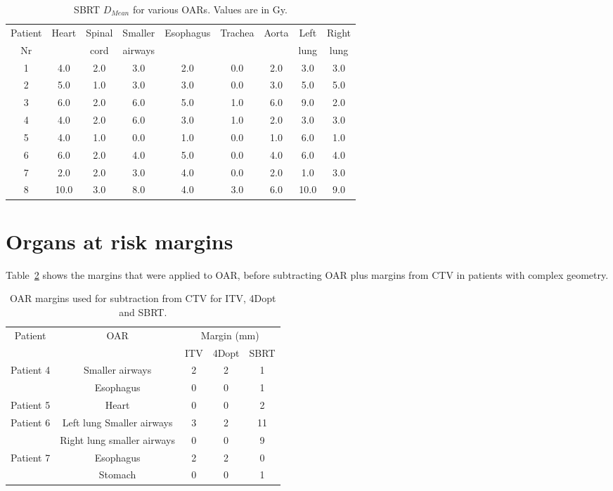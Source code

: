 \begin{table}[H]
  \centering
  \caption{SBRT $D_{Mean}$ for various OARs. Values are in Gy.}
  \begin{tabular}{c|c|c|c|c|c|c|c|c}
   Patient & \multirow{2}{*}{Heart} & Spinal  & Smaller  & \multirow{2}{*}{Esophagus} & \multirow{2}{*}{Trachea} & \multirow{2}{*}{Aorta} & Left  & Right \\
   Nr & & cord & airways & & & & lung & lung \\
 \hline\hline 
1 & 4.0 & 2.0 & 3.0 & 2.0 & 0.0 & 2.0 & 3.0 & 3.0 \\ 
2 & 5.0 & 1.0 & 3.0 & 3.0 & 0.0 & 3.0 & 5.0 & 5.0 \\ 
3 & 6.0 & 2.0 & 6.0 & 5.0 & 1.0 & 6.0 & 9.0 & 2.0 \\ 
4 & 4.0 & 2.0 & 6.0 & 3.0 & 1.0 & 2.0 & 3.0 & 3.0 \\ 
5 & 4.0 & 1.0 & 0.0 & 1.0 & 0.0 & 1.0 & 6.0 & 1.0 \\ 
6 & 6.0 & 2.0 & 4.0 & 5.0 & 0.0 & 4.0 & 6.0 & 4.0 \\ 
7 & 2.0 & 2.0 & 3.0 & 4.0 & 0.0 & 2.0 & 1.0 & 3.0 \\ 
8 & 10.0 & 3.0 & 8.0 & 4.0 & 3.0 & 6.0 & 10.0 & 9.0 \\ 
\hline\hline
  \end{tabular}
  \label{tab:oarlimits1}
\end{table}

\newpage
\section{Organs at risk margins}

Table~\ref{tab:oarmargins} shows the margins that were applied to OAR, before subtracting OAR plus margins from CTV in patients with complex geometry.

\begin{table}[H]
  \centering
  \caption{OAR margins used for subtraction from CTV for ITV, 4Dopt and SBRT.}
  \begin{tabular}{|c|c|c|c|c|} \hline
\multirow{2}{*}{Patient} & \multirow{2}{*}{OAR} & \multicolumn{3}{|c|}{Margin (mm)} \\
& &  ITV & 4Dopt & SBRT\\
   \hline\hline

   \multirow{2}{*}{Patient 4} & Smaller airways & 2 & 2 & 1 \\
    & Esophagus & 0 & 0 & 1 \\ \hline
    Patient 5 & Heart & 0 & 0 & 2 \\ \hline
    \multirow{2}{*}{Patient 6} & Left lung Smaller airways & 3 & 2 & 11 \\
    & Right lung smaller airways & 0 & 0 & 9 \\ \hline
    \multirow{2}{*}{Patient 7} & Esophagus & 2 & 2 & 0 \\
    & Stomach & 0 & 0 & 1\\
    
\hline\hline
  
  \end{tabular}
  \label{tab:oarmargins}
\end{table}
% 
